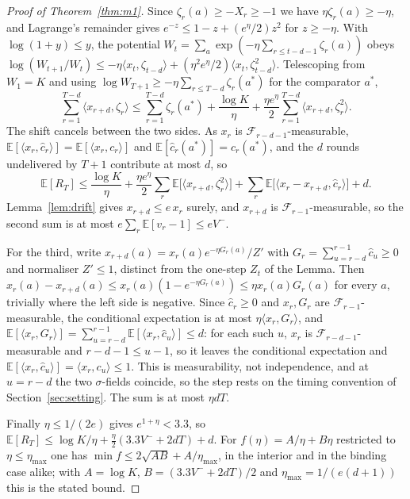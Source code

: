 \documentclass{article}
\theoremstyle{remark}
\newcommand{\Ex}{\mathbb{E}}
\begin{document}
\begin{proof}[Proof of Theorem~\ref{thm:m1}]
Since $\zeta_r(a)\ge-X_r\ge-1$ we have $\eta\zeta_r(a)\ge-\eta$, and Lagrange's remainder gives
$e^{-z}\le1-z+(e^\eta/2)z^2$ for $z\ge-\eta$. With $\log(1+y)\le y$, the potential
$W_t=\sum_a\exp(-\eta\sum_{r\le t-d-1}\zeta_r(a))$ obeys
$\log(W_{t+1}/W_t)\le-\eta\langle x_t,\zeta_{t-d}\rangle
+(\eta^2e^\eta/2)\langle x_t,\zeta_{t-d}^2\rangle$. Telescoping from $W_1=K$ and using
$\log W_{T+1}\ge-\eta\sum_{r\le T-d}\zeta_r(a^\ast)$ for the comparator $a^\ast$,
\[
\sum_{r=1}^{T-d}\langle x_{r+d},\zeta_r\rangle\le\sum_{r=1}^{T-d}\zeta_r(a^\ast)
+\frac{\log K}{\eta}+\frac{\eta e^\eta}{2}\sum_{r=1}^{T-d}\langle x_{r+d},\zeta_r^2\rangle .
\]
The shift cancels between the two sides. As $x_r$ is $\mathcal F_{r-d-1}$-measurable,
$\Ex[\langle x_r,\hat c_r\rangle]=\Ex[\langle x_r,c_r\rangle]$ and $\Ex[\hat c_r(a^\ast)]=
c_r(a^\ast)$, and the $d$ rounds undelivered by $T+1$ contribute at most $d$, so
\[
\Ex[R_T]\le\frac{\log K}{\eta}
+\frac{\eta e^\eta}{2}\sum_r\Ex\bigl[\langle x_{r+d},\zeta_r^2\rangle\bigr]
+\sum_r\Ex\bigl[\langle x_r-x_{r+d},\hat c_r\rangle\bigr]+d .
\]
Lemma~\ref{lem:drift} gives $x_{r+d}\le e\,x_r$ surely, and $x_{r+d}$ is
$\mathcal F_{r-1}$-measurable, so the second sum is at most $e\sum_r\Ex[v_r-1]\le eV^-$.

For the third, write $x_{r+d}(a)=x_r(a)e^{-\eta G_r(a)}/Z'$ with
$G_r=\sum_{u=r-d}^{r-1}\hat c_u\ge0$ and normaliser $Z'\le1$, distinct from the one-step $Z_t$
of the Lemma. Then
$x_r(a)-x_{r+d}(a)\le x_r(a)(1-e^{-\eta G_r(a)})\le\eta x_r(a)G_r(a)$ for every $a$, trivially
where the left side is negative. Since $\hat c_r\ge0$ and $x_r,G_r$ are
$\mathcal F_{r-1}$-measurable, the conditional expectation is at most $\eta\langle x_r,G_r\rangle$,
and $\Ex[\langle x_r,G_r\rangle]=\sum_{u=r-d}^{r-1}\Ex[\langle x_r,\hat c_u\rangle]\le d$: for each
such $u$, $x_r$ is $\mathcal F_{r-d-1}$-measurable and $r-d-1\le u-1$, so it leaves the conditional
expectation and $\Ex[\langle x_r,\hat c_u\rangle]=\langle x_r,c_u\rangle\le1$. This is
measurability, not independence, and at $u=r-d$ the two $\sigma$-fields coincide, so the step rests
on the timing convention of Section~\ref{sec:setting}. The sum is at most $\eta dT$.

Finally $\eta\le1/(2e)$ gives $e^{1+\eta}<3.3$, so
$\Ex[R_T]\le\log K/\eta+\tfrac{\eta}{2}(3.3V^-+2dT)+d$. For $f(\eta)=A/\eta+B\eta$ restricted to
$\eta\le\eta_{\max}$ one has $\min f\le2\sqrt{AB}+A/\eta_{\max}$, in the interior and in the binding
case alike; with $A=\log K$, $B=(3.3V^-+2dT)/2$ and $\eta_{\max}=1/(e(d+1))$ this is the stated
bound.
\end{proof}
\end{document}
